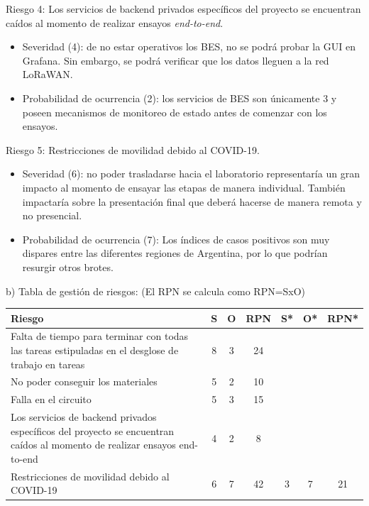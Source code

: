 \documentclass[11pt]{charter}
\begin{document}
Riesgo 4: Los servicios de backend privados específicos del proyecto se encuentran caídos al momento de realizar ensayos \textit{end-to-end}.
\begin{itemize}
	\item Severidad (4): de no estar operativos los BES, no se podrá probar la GUI en Grafana. Sin embargo, se podrá verificar que los datos lleguen a la red LoRaWAN.
	\item Probabilidad de ocurrencia (2): los servicios de BES son únicamente 3 y poseen mecanismos de monitoreo de estado antes de comenzar con los ensayos.
\end{itemize}


Riesgo 5: Restricciones de movilidad debido al COVID-19.
\begin{itemize}
	\item Severidad (6): no poder trasladarse hacia el laboratorio representaría un gran impacto al momento de ensayar las etapas de manera individual. También impactaría sobre la presentación final que deberá hacerse de manera remota y no presencial.
	\item Probabilidad de ocurrencia (7): Los índices de casos positivos son muy dispares entre las diferentes regiones de Argentina, por lo que podrían resurgir otros brotes.
\end{itemize}

b) Tabla de gestión de riesgos:      (El RPN se calcula como RPN=SxO)

\begin{table}[htpb]
\centering
\begin{tabularx}{\linewidth}{@{}|X|c|c|c|c|c|c|@{}}
\hline
\rowcolor[HTML]{C0C0C0} 
Riesgo & S & O & RPN & S* & O* & RPN* \\ \hline
Falta de tiempo para terminar con todas las tareas estipuladas en el desglose de trabajo en tareas& 8 & 3 & 24 &    &    &      \\ \hline
No poder conseguir los materiales& 5 & 2 & 10  &    &    &      \\ \hline
Falla en el circuito& 5 & 3 & 15  &    &    &      \\ \hline
Los servicios de backend privados específicos del proyecto se encuentran caídos al momento de realizar ensayos end-to-end& 4 & 2 & 8   &    &    &      \\ \hline
Restricciones de movilidad debido al COVID-19& 6 & 7 & 42  &  3  &  7  &  21 \\ \hline
\end{tabularx}%
\end{table}
\end{document}
